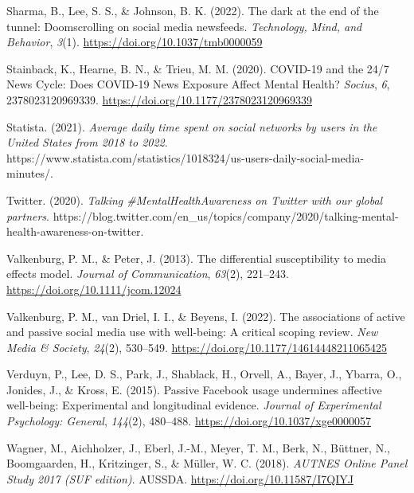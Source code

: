 \documentclass[
  man,mask,floatsintext]{apa7}
\newlength{\cslhangindent}
\newlength{\cslentryspacingunit} %
\newenvironment{CSLReferences}[2] %
 {%
  \setlength{\parindent}{0pt}
  \ifodd #1
  \let\oldpar\par
  \def\par{\hangindent=\cslhangindent\oldpar}
  \fi
  \setlength{\parskip}{#2\cslentryspacingunit}
 }%
 {}
\begin{document}
\begin{CSLReferences}{1}{0}
\leavevmode{}%
Sharma, B., Lee, S. S., \& Johnson, B. K. (2022). The dark at the end of the tunnel: {Doomscrolling} on social media newsfeeds. \emph{Technology, Mind, and Behavior}, \emph{3}(1). \url{https://doi.org/10.1037/tmb0000059}

\leavevmode{}%
Stainback, K., Hearne, B. N., \& Trieu, M. M. (2020). {COVID-19} and the 24/7 {News Cycle}: {Does COVID-19 News Exposure Affect Mental Health}? \emph{Socius}, \emph{6}, 2378023120969339. \url{https://doi.org/10.1177/2378023120969339}

\leavevmode{}%
Statista. (2021). \emph{Average daily time spent on social networks by users in the {United States} from 2018 to 2022}. https://www.statista.com/statistics/1018324/us-users-daily-social-media-minutes/.

\leavevmode{}%
Twitter. (2020). \emph{Talking \#{MentalHealthAwareness} on {Twitter} with our global partners}. https://blog.twitter.com/en\_us/topics/company/2020/talking-mental-health-awareness-on-twitter.

\leavevmode{}%
Valkenburg, P. M., \& Peter, J. (2013). The differential susceptibility to media effects model. \emph{Journal of Communication}, \emph{63}(2), 221--243. \url{https://doi.org/10.1111/jcom.12024}

\leavevmode{}%
Valkenburg, P. M., van Driel, I. I., \& Beyens, I. (2022). The associations of active and passive social media use with well-being: {A} critical scoping review. \emph{New Media \& Society}, \emph{24}(2), 530--549. \url{https://doi.org/10.1177/14614448211065425}

\leavevmode{}%
Verduyn, P., Lee, D. S., Park, J., Shablack, H., Orvell, A., Bayer, J., Ybarra, O., Jonides, J., \& Kross, E. (2015). Passive {Facebook} usage undermines affective well-being: {Experimental} and longitudinal evidence. \emph{Journal of Experimental Psychology: General}, \emph{144}(2), 480--488. \url{https://doi.org/10.1037/xge0000057}

\leavevmode{}%
Wagner, M., Aichholzer, J., Eberl, J.-M., Meyer, T. M., Berk, N., Büttner, N., Boomgaarden, H., Kritzinger, S., \& Müller, W. C. (2018). \emph{{AUTNES Online Panel Study} 2017 ({SUF} edition)}. {AUSSDA}. \url{https://doi.org/10.11587/I7QIYJ}


\end{CSLReferences}
\end{document}
